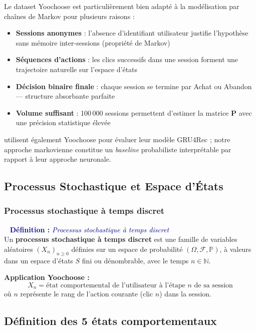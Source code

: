 \documentclass[11pt,a4paper]{article}
\newenvironment{defbox}[1]{%
  \vspace{3pt}\begin{framed}
  \noindent{\color{NavyBlue}\rule{0.3cm}{3pt}}~%
  \textcolor{DarkBlue}{\textbf{Définition :} \textit{#1}}\\[3pt]}
  {\end{framed}\vspace{3pt}}
\newcommand{\mat}[1]{\mathbf{#1}}
\newcommand{\Prob}{\mathbb{P}}
\begin{document}
Le dataset Yoochoose est particulièrement bien adapté à la modélisation
par chaînes de Markov pour plusieurs raisons :
\begin{itemize}[itemsep=2pt]
  \item \textbf{Sessions anonymes} : l'absence d'identifiant utilisateur
        justifie l'hypothèse sans mémoire inter-sessions (propriété de Markov)
  \item \textbf{Séquences d'actions} : les clics successifs dans une session
        forment une trajectoire naturelle sur l'espace d'états
  \item \textbf{Décision binaire finale} : chaque session se termine
        par Achat ou Abandon --- structure absorbante parfaite
  \item \textbf{Volume suffisant} : 100\,000 sessions permettent
        d'estimer la matrice $\mat{P}$ avec une précision statistique élevée
\end{itemize}

\cite{hidasi2016} utilisent également Yoochoose pour évaluer leur modèle
GRU4Rec ; notre approche markovienne constitue un \emph{baseline}
probabiliste interprétable par rapport à leur approche neuronale.

\subsection{Processus Stochastique et Espace d'États}

\subsubsection{Processus stochastique à temps discret}

\begin{defbox}{Processus stochastique à temps discret}
Un \textbf{processus stochastique à temps discret} est une famille
de variables aléatoires $(X_n)_{n \geq 0}$ définies sur un espace de
probabilité $(\Omega, \mathcal{F}, \Prob)$, à valeurs dans un espace
d'états $S$ fini ou dénombrable, avec le temps $n \in \mathbb{N}$.
\end{defbox}

\textbf{Application Yoochoose :}
\[
  X_n = \text{état comportemental de l'utilisateur à l'étape } n
  \text{ de sa session}
\]
où $n$ représente le rang de l'action courante (clic $n$) dans la session.

\subsection{Définition des 5 états comportementaux}
\end{document}

